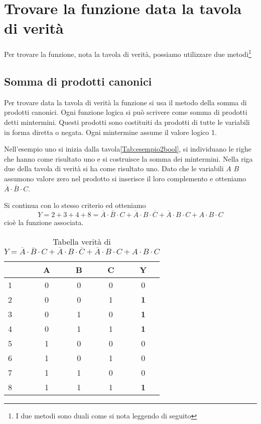 \section{Trovare la funzione data la tavola di verità}
\label{sec:Trovarefunzionedatatavolaverità}
Per trovare la funzione, nota la tavola di verità, possiamo utilizzare due metodi\footnote{I due metodi sono duali come si nota leggendo di seguito} 
\subsection{Somma di prodotti canonici} 
Per trovare data la tavola di verità la funzione si usa il metodo della somma di prodotti canonici. Ogni funzione logica si può scrivere come somma di prodotti detti mintermini. Questi prodotti sono costituiti da prodotti di tutte le variabili in forma diretta o negata. Ogni mintermine assume il valore logico 1.

Nell'esempio uno si inizia dalla tavola\nobs\vref{Tab:esempio2bool},  si individuano le righe che hanno come risultato uno e si costruisce la somma dei mintermini. Nella riga due della tavola di verità si ha come risultato uno. Dato che le variabili $A$ $B$ assumono valore zero nel prodotto si inserisce il loro complemento e otteniamo $\overline{A}\cdot \overline{B}\cdot C$.

Si continua con lo stesso criterio ed otteniamo\[Y=2+3+4+8=\overline{A}\cdot\overline{B}\cdot C+\overline{A}\cdot B\cdot\overline{C}+\overline{A}\cdot B\cdot C+A\cdot B\cdot C\] cioè la funzione associata.
\begin{table}
	\centering
	\begin{tabular}{lccc|c}
		&A&B&C&Y\\
		\toprule
		1&0&0&0&0\\
		2&0&0&1&\textbf{1}\\
		3&0&1&0&\textbf{1}\\
		4&0&1&1&\textbf{1}\\
		5&1&0&0&0\\
		6&1&0&1&0\\
		7&1&1&0&0\\
		8&1&1&1&\textbf{1}\\
	\end{tabular}
	\caption[]{Tabella verità di $Y=\overline{A}\cdot\overline{B}\cdot C+\overline{A}\cdot B\cdot\overline{C}+\overline{A}\cdot B\cdot C+A\cdot B\cdot C$}
	\label{Tab:esempio2bool}
\end{table}
